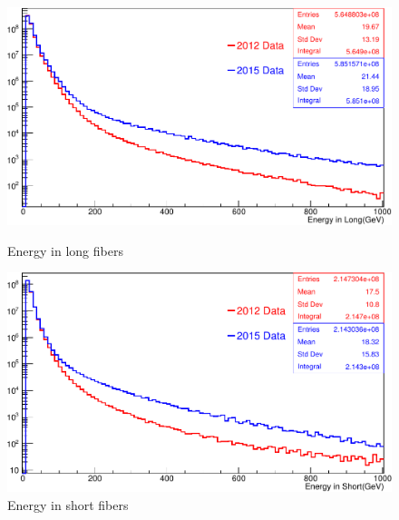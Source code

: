 \begin{itemize}
\begin{figure}[ht]
\begin{minipage}[b]{0.5\linewidth}
\centering
\includegraphics[width=\linewidth]{../Figures/Chap2/ImageFiles_HF/2012vs2015/Elong1DCompare.pdf}
\captionsetup{width=.9\linewidth}
\caption{Energy in long fibers}
\label{2012vs2015E1}
\end{minipage}
\hspace{0.5cm}
\begin{minipage}[b]{0.5\linewidth}
\centering
\includegraphics[width=\linewidth]{../Figures/Chap2/ImageFiles_HF/2012vs2015/Eshort1DCompare.pdf}
\captionsetup{width=.9\linewidth}
\caption{Energy in short fibers}
\label{2012vs2015E2}
\end{minipage}
\end{figure}
\end{itemize}

